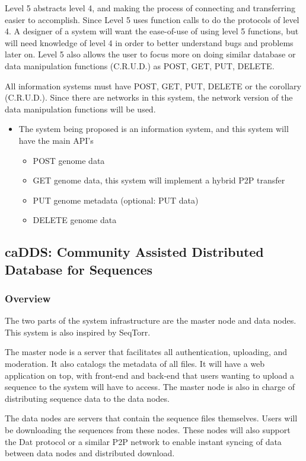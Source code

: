 \documentclass[acmsmall]{acmart}
\begin{document}
\begin{multicols}{2}
Level 5 abstracts level 4, and making the process of connecting and transferring easier to accomplish. Since Level 5 uses function calls to do the protocols of level 4. A designer of a system will want the ease-of-use of using level 5 functions, but will need knowledge of level 4 in order to better understand bugs and problems later on. Level 5 also allows the user to focus more on doing similar database or data manipulation functions (C.R.U.D.) as POST, GET, PUT, DELETE. 

All information systems must have POST, GET, PUT, DELETE or the corollary (C.R.U.D.). Since there are networks in this system, the network version of the data manipulation functions will be used.

\begin{itemize}
    \item The system being proposed is an information system, and this system will have the main API’s
    \begin{itemize}
        \item POST genome data
        \item GET genome data, this system will implement a hybrid P2P transfer
        \item PUT genome metadata (optional: PUT data)
        \item DELETE genome data
    \end{itemize}
\end{itemize}



\subsection{caDDS: Community Assisted Distributed Database for Sequences}

\subsubsection{Overview}
The two parts of the system infrastructure are the master node and data nodes. This system is also inspired by SeqTorr. 

The master node is a server that facilitates all authentication, uploading, and moderation. It also catalogs the metadata of all files. It will have a web application on top, with front-end and back-end that users wanting to upload a sequence to the system will have to access. The master node is also in charge of distributing sequence data to the data nodes.

The data nodes are servers that contain the sequence files themselves. Users will be downloading the sequences from these nodes. These nodes will also support the Dat protocol or a similar P2P network to enable instant syncing of data between data nodes and distributed download.


\end{multicols}
\end{document}

